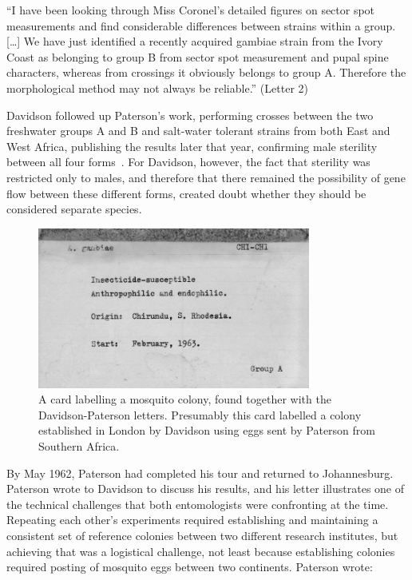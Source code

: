 \documentclass[a4paper,11pt,abstracton,hidelinks]{scrartcl}
\begin{document}
\begin{displayquote}
``I have been looking through Miss Coronel's detailed figures on sector spot measurements and find considerable differences between strains within a group. [\ldots] We have just identified a recently acquired gambiae strain from the Ivory Coast as belonging to group B from sector spot measurement and pupal spine characters, whereas from crossings it obviously belongs to group A. Therefore the morphological method may not always be reliable.'' (Letter 2)
\end{displayquote}


Davidson followed up Paterson's work, performing crosses between the two freshwater groups A and B and salt-water tolerant strains from both East and West Africa, publishing the results later that year, confirming male sterility between all four forms~\parencite{Davidson1962b}.
%
For Davidson, however, the fact that sterility was restricted only to males, and therefore that there remained the possibility of gene flow between these different forms, created doubt whether they should be considered separate species.


\begin{figure}[t]
\centering
\includegraphics[width=0.8\textwidth]{davidson-letters/Cards-colonies.pdf}
\caption{A card labelling a mosquito colony, found together with the Davidson-Paterson letters. Presumably this card labelled a colony established in London by Davidson using eggs sent by Paterson from Southern Africa.}
\label{fig:colony-cards}
\end{figure}


By May 1962, Paterson had completed his tour and returned to Johannesburg.
%
Paterson wrote to Davidson to discuss his results, and his letter illustrates one of the technical challenges that both entomologists were confronting at the time.
%
Repeating each other's experiments required establishing and maintaining a consistent set of reference colonies between two different research institutes, but achieving that was a logistical challenge, not least because establishing colonies required posting of mosquito eggs between two continents.
%
Paterson wrote:
\end{document}
